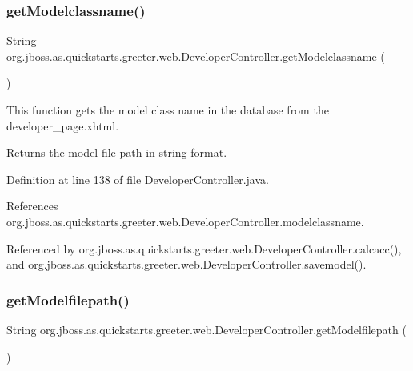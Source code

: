 \subsubsection{\texorpdfstring{get\+Modelclassname()}{getModelclassname()}}
{\footnotesize\ttfamily String org.\+jboss.\+as.\+quickstarts.\+greeter.\+web.\+Developer\+Controller.\+get\+Modelclassname (\begin{DoxyParamCaption}{ }\end{DoxyParamCaption})}



This function gets the model class name in the database from the developer\+\_\+page.\+xhtml. 

\begin{DoxyReturn}{Returns}
the model file path in string format. 
\end{DoxyReturn}


Definition at line 138 of file Developer\+Controller.\+java.



References org.\+jboss.\+as.\+quickstarts.\+greeter.\+web.\+Developer\+Controller.\+modelclassname.



Referenced by org.\+jboss.\+as.\+quickstarts.\+greeter.\+web.\+Developer\+Controller.\+calcacc(), and org.\+jboss.\+as.\+quickstarts.\+greeter.\+web.\+Developer\+Controller.\+savemodel().

\mbox{\label{classorg_1_1jboss_1_1as_1_1quickstarts_1_1greeter_1_1web_1_1_developer_controller_a7e84dcd2c68bc4af89723a1fcd0fb3ae}} 
\subsubsection{\texorpdfstring{get\+Modelfilepath()}{getModelfilepath()}}
{\footnotesize\ttfamily String org.\+jboss.\+as.\+quickstarts.\+greeter.\+web.\+Developer\+Controller.\+get\+Modelfilepath (\begin{DoxyParamCaption}{ }\end{DoxyParamCaption})}




